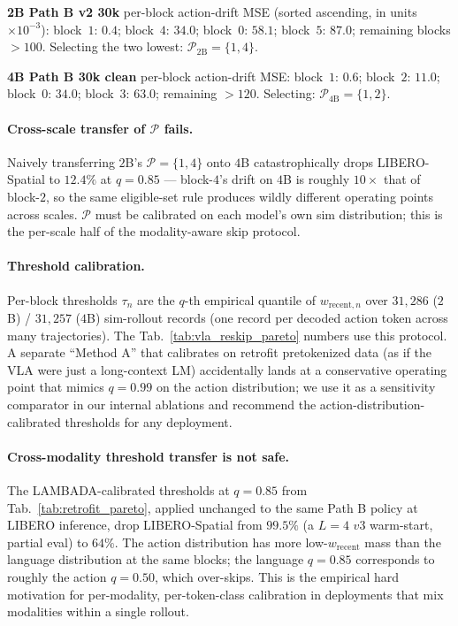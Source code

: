 \documentclass{article}
\begin{document}
\textbf{2B Path B v2 30k} per-block action-drift MSE (sorted ascending, in units $\times 10^{-3}$):
block~$1$: $0.4$; block~$4$: $34.0$; block~$0$: $58.1$; block~$5$: $87.0$; remaining blocks $>$$100$. Selecting the two lowest: $\mathcal{P}_{2\text{B}}=\{1, 4\}$.

\textbf{4B Path B 30k clean} per-block action-drift MSE: block~$1$: $0.6$; block~$2$: $11.0$; block~$0$: $34.0$; block~$3$: $63.0$; remaining $>$$120$. Selecting: $\mathcal{P}_{4\text{B}}=\{1, 2\}$.

\paragraph{Cross-scale transfer of $\mathcal{P}$ fails.} Naively transferring $2$B's $\mathcal{P}{=}\{1, 4\}$ onto $4$B catastrophically drops LIBERO-Spatial to $12.4\%$ at $q{=}0.85$ — block-$4$'s drift on $4$B is roughly $10\times$ that of block-$2$, so the same eligible-set rule produces wildly different operating points across scales. $\mathcal{P}$ must be calibrated on each model's own sim distribution; this is the per-scale half of the modality-aware skip protocol.

\paragraph{Threshold calibration.} Per-block thresholds $\tau_n$ are the $q$-th empirical quantile of $w_{\text{recent},n}$ over $31{,}286$ ($2$B) / $31{,}257$ ($4$B) sim-rollout records (one record per decoded action token across many trajectories). The Tab.~\ref{tab:vla_reskip_pareto} numbers use this protocol. A separate ``Method A'' that calibrates on retrofit pretokenized data (as if the VLA were just a long-context LM) accidentally lands at a conservative operating point that mimics $q{=}0.99$ on the action distribution; we use it as a sensitivity comparator in our internal ablations and recommend the action-distribution-calibrated thresholds for any deployment.

\paragraph{Cross-modality threshold transfer is not safe.} The LAMBADA-calibrated thresholds at $q{=}0.85$ from Tab.~\ref{tab:retrofit_pareto}, applied unchanged to the same Path B policy at LIBERO inference, drop LIBERO-Spatial from $99.5\%$ (a $L{=}4$ $v3$ warm-start, partial eval) to $64\%$. The action distribution has more low-$w_{\text{recent}}$ mass than the language distribution at the same blocks; the language $q{=}0.85$ corresponds to roughly the action $q{=}0.50$, which over-skips. This is the empirical hard motivation for per-modality, per-token-class calibration in deployments that mix modalities within a single rollout.
\end{document}
